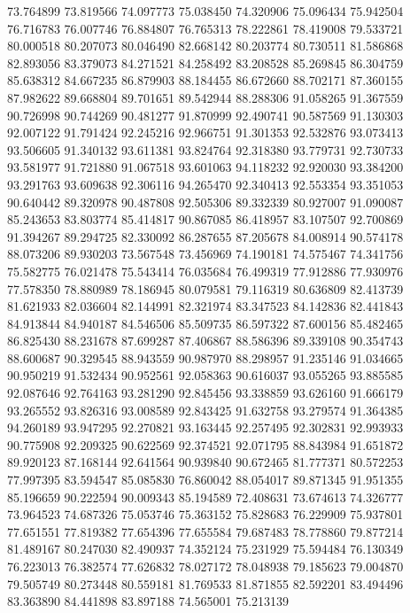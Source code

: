 73.764899
73.819566
74.097773
75.038450
74.320906
75.096434
75.942504
76.716783
76.007746
76.884807
76.765313
78.222861
78.419008
79.533721
80.000518
80.207073
80.046490
82.668142
80.203774
80.730511
81.586868
82.893056
83.379073
84.271521
84.258492
83.208528
85.269845
86.304759
85.638312
84.667235
86.879903
88.184455
86.672660
88.702171
87.360155
87.982622
89.668804
89.701651
89.542944
88.288306
91.058265
91.367559
90.726998
90.744269
90.481277
91.870999
92.490741
90.587569
91.130303
92.007122
91.791424
92.245216
92.966751
91.301353
92.532876
93.073413
93.506605
91.340132
93.611381
93.824764
92.318380
93.779731
92.730733
93.581977
91.721880
91.067518
93.601063
94.118232
92.920030
93.384200
93.291763
93.609638
92.306116
94.265470
92.340413
92.553354
93.351053
90.640442
89.320978
90.487808
92.505306
89.332339
80.927007
91.090087
85.243653
83.803774
85.414817
90.867085
86.418957
83.107507
92.700869
91.394267
89.294725
82.330092
86.287655
87.205678
84.008914
90.574178
88.073206
89.930203
73.567548
73.456969
74.190181
74.575467
74.341756
75.582775
76.021478
75.543414
76.035684
76.499319
77.912886
77.930976
77.578350
78.880989
78.186945
80.079581
79.116319
80.636809
82.413739
81.621933
82.036604
82.144991
82.321974
83.347523
84.142836
82.441843
84.913844
84.940187
84.546506
85.509735
86.597322
87.600156
85.482465
86.825430
88.231678
87.699287
87.406867
88.586396
89.339108
90.354743
88.600687
90.329545
88.943559
90.987970
88.298957
91.235146
91.034665
90.950219
91.532434
90.952561
92.058363
90.616037
93.055265
93.885585
92.087646
92.764163
93.281290
92.845456
93.338859
93.626160
91.666179
93.265552
93.826316
93.008589
92.843425
91.632758
93.279574
91.364385
94.260189
93.947295
92.270821
93.163445
92.257495
92.302831
92.993933
90.775908
92.209325
90.622569
92.374521
92.071795
88.843984
91.651872
89.920123
87.168144
92.641564
90.939840
90.672465
81.777371
80.572253
77.997395
83.594547
85.085830
76.860042
88.054017
89.871345
91.951355
85.196659
90.222594
90.009343
85.194589
72.408631
73.674613
74.326777
73.964523
74.687326
75.053746
75.363152
75.828683
76.229909
75.937801
77.651551
77.819382
77.654396
77.655584
79.687483
78.778860
79.877214
81.489167
80.247030
82.490937
74.352124
75.231929
75.594484
76.130349
76.223013
76.382574
77.626832
78.027172
78.048938
79.185623
79.004870
79.505749
80.273448
80.559181
81.769533
81.871855
82.592201
83.494496
83.363890
84.441898
83.897188
74.565001
75.213139
